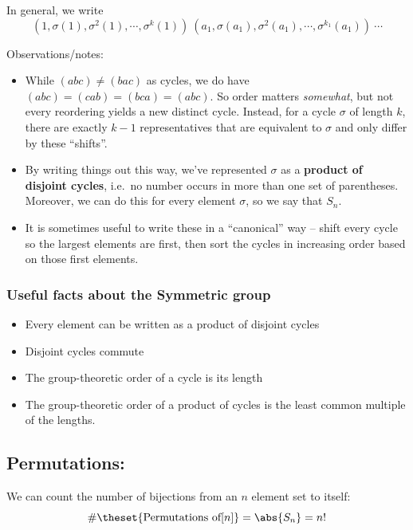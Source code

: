 In general, we write \[
(1, \sigma(1), \sigma^2(1), \cdots, \sigma^{k}(1))~(a_1, \sigma(a_1), \sigma^2(a_1), \cdots, \sigma^{k_1}(a_1)) ~ \cdots
\]

Observations/notes:

\begin{itemize}
\tightlist
\item
  While \((abc) \neq (bac)\) as cycles, we do have
  \((abc) = (cab) = (bca) = (abc)\). So order matters \emph{somewhat},
  but not every reordering yields a new distinct cycle. Instead, for a
  cycle \(\sigma\) of length \(k\), there are exactly \(k-1\)
  representatives that are equivalent to \(\sigma\) and only differ by
  these ``shifts''.
\item
  By writing things out this way, we've represented \(\sigma\) as a
  \textbf{product of disjoint cycles}, i.e.~no number occurs in more
  than one set of parentheses. Moreover, we can do this for every
  element \(\sigma\), so we say that \(S_n\).
\item
  It is sometimes useful to write these in a ``canonical'' way -- shift
  every cycle so the largest elements are first, then sort the cycles in
  increasing order based on those first elements.
\end{itemize}

\hypertarget{useful-facts-about-the-symmetric-group}{%
\subsubsection{Useful facts about the Symmetric
group}\label{useful-facts-about-the-symmetric-group}}

\begin{itemize}
\tightlist
\item
  Every element can be written as a product of disjoint cycles
\item
  Disjoint cycles commute
\item
  The group-theoretic order of a cycle is its length
\item
  The group-theoretic order of a product of cycles is the least common
  multiple of the lengths.
\end{itemize}

\hypertarget{permutations}{%
\subsection{Permutations:}\label{permutations}}

We can count the number of bijections from an \(n\) element set to
itself: \[ \#\theset{\text{Permutations of} [n]} = \abs{S_n}  = n! \]

